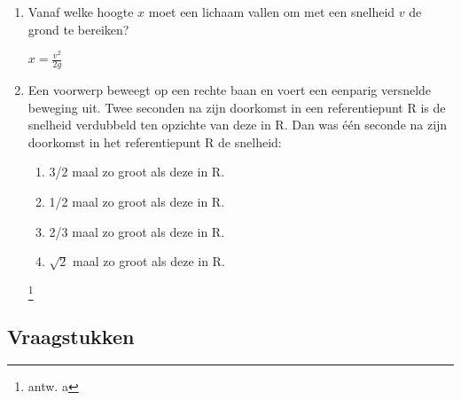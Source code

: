 \begin{enumerate}
\item Vanaf welke hoogte $x$ moet een lichaam vallen om met een snelheid $v$ de grond te bereiken?

\begin{oplossing}
	$x=\frac{v^2}{2g}$
\end{oplossing}



\item Een voorwerp beweegt op een rechte baan en
voert een eenparig versnelde beweging uit. Twee seconden na zijn
doorkomst in een referentiepunt R is de snelheid verdubbeld ten
opzichte van deze in R.
\newline
\newline
Dan was \'e\'en seconde na zijn doorkomst in het referentiepunt R de
snelheid:
\begin{enumerate}
\item 3/2 maal zo groot als deze in R.
\item 1/2 maal zo groot als deze in R.
\item 2/3 maal zo groot als deze in R.
\item $\sqrt{2}$ maal zo groot als deze in R.
\end{enumerate}
\footnote{antw. a}



\end{enumerate}




\cleardoublepage





\subsection{Vraagstukken}

